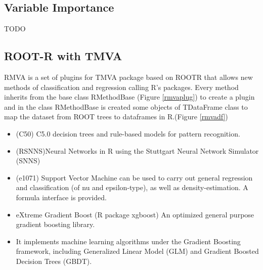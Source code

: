\documentclass[a4paper]{jpconf}
\begin{document}
\subsection{Variable Importance}
TODO

\clearpage
\subsection{ROOT-R with TMVA}\label{RMVA}
RMVA is a set of plugins for TMVA package based on ROOTR
that allows new methods of classification and regression calling
R's packages.
Every method inherits from the base class RMethodBase (Figure \ref{rmvaplug})
to create a plugin and in the class RMethodBase is created some objects of TDataFrame class to map
the dataset from ROOT trees to dataframes in R.(Figure \ref{rmvadf}) 
\begin{itemize}  
\item (C50) C5.0 decision trees and rule-based models for pattern
recognition.
\item (RSNNS)Neural Networks in R using the Stuttgart Neural
Network Simulator (SNNS)
\item (e1071) Support Vector Machine can be used to carry out
general regression and classification (of nu and epsilon-type),
as well as density-estimation. A formula interface is provided.
\item eXtreme Gradient Boost (R package xgboost) An optimized
general purpose gradient boosting library.
\item It implements machine learning algorithms under the Gradient
Boosting framework, including Generalized Linear Model (GLM)
and Gradient Boosted Decision Trees (GBDT). 
\end{itemize}
\end{document}
